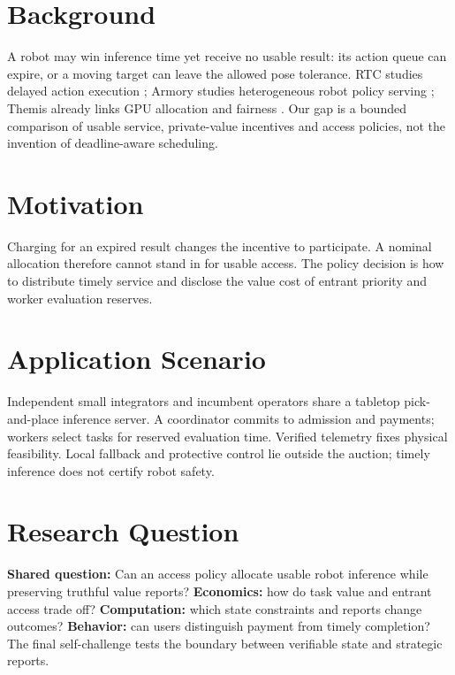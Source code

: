 
\section{Background}
A robot may win inference time yet receive no usable result: its action queue can expire, or a moving target can leave the allowed pose tolerance. RTC studies delayed action execution \cite{rtc}; Armory studies heterogeneous robot policy serving \cite{armory}; Themis already links GPU allocation and fairness \cite{themis}. Our gap is a bounded comparison of usable service, private-value incentives and access policies, not the invention of deadline-aware scheduling.

\section{Motivation}
Charging for an expired result changes the incentive to participate. A nominal allocation therefore cannot stand in for usable access. The policy decision is how to distribute timely service and disclose the value cost of entrant priority and worker evaluation reserves.

\section{Application Scenario}
Independent small integrators and incumbent operators share a tabletop pick-and-place inference server. A coordinator commits to admission and payments; workers select tasks for reserved evaluation time. Verified telemetry fixes physical feasibility. Local fallback and protective control lie outside the auction; timely inference does not certify robot safety.

\section{Research Question}
\textbf{Shared question:} Can an access policy allocate usable robot inference while preserving truthful value reports? \textbf{Economics:} how do task value and entrant access trade off? \textbf{Computation:} which state constraints and reports change outcomes? \textbf{Behavior:} can users distinguish payment from timely completion? The final self-challenge tests the boundary between verifiable state and strategic reports.

